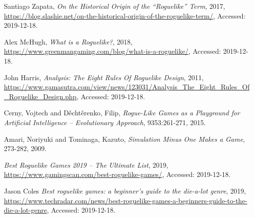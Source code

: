 \documentclass[a4paper]{article}
\begin{document}
\begin{thebibliography}{1}
  
  Santiago Zapata,
  \emph{On the Historical Origin of the “Roguelike” Term}, 2017,
  {\url{https://blog.slashie.net/on-the-historical-origin-of-the-roguelike-term/}},
  {Accessed: 2019-12-18}.
  
  Alex McHugh,
  \emph{What is a Roguelike?}, 2018,
  {\url{https://www.greenmangaming.com/blog/what-is-a-roguelike/}},
  {Accessed: 2019-12-18}.
  
  John Harris,
  \emph{Analysis: The Eight Rules Of Roguelike Design}, 2011,
  {\url{https://www.gamasutra.com/view/news/123031/Analysis_The_Eight_Rules_Of_Roguelike_Design.php}},
  {Accessed: 2019-12-18}.


 {Cerny, Vojtech and Děchtěrenko, Filip},
\emph{Rogue-Like Games as a Playground for Artificial Intelligence – Evolutionary Approach},
9353:{261-271}, {2015}.

 {Amari, Noriyuki and Tominaga, Kazuto},
\emph{Simulation Minus One Makes a Game},
273-282, {2009}.

  \emph{Best Roguelike Games 2019 – The Ultimate List}, 2019,
  {\url{https://www.gamingscan.com/best-roguelike-games/}},
  {Accessed: 2019-12-18}.

    Jason Coles
  \emph{Best roguelike games: a beginner's guide to the die-a-lot genre}, 2019,
  {\url{https://www.techradar.com/news/best-roguelike-games-a-beginners-guide-to-the-die-a-lot-genre}},
  {Accessed: 2019-12-18}.


\end{thebibliography}
\end{document}
